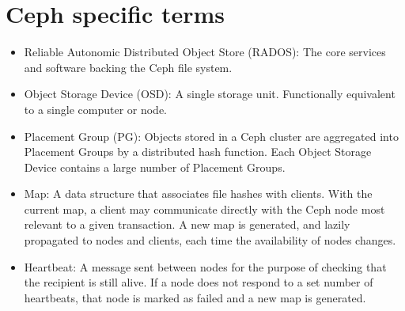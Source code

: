 \section{Ceph specific terms}

\begin{itemize}
  \item Reliable Autonomic Distributed Object Store (RADOS): The core services and software backing the Ceph file system.
  
  \item Object Storage Device (OSD): A single storage unit. Functionally equivalent to a single computer or node.

  \item Placement Group (PG): Objects stored in a Ceph cluster are aggregated into
   Placement Groups by a distributed hash function. Each Object Storage Device
   contains a large number of Placement Groups.
   
  \item Map: A data structure that associates file hashes with clients. With the current map, a 
  	client may communicate directly with the Ceph node most relevant to a given transaction. A new
  	map is generated, and lazily propagated to nodes and clients, each time the availability of 
  	nodes changes.
  	
  \item Heartbeat: A message sent between nodes for the purpose of checking that the recipient is
  	still alive. If a node does not respond to a set number of heartbeats, that node is marked as 
  	failed and a new map is generated.

\end{itemize}
